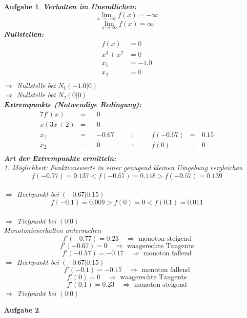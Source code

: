 \documentclass[12pt]{article}
\theoremstyle{note}
\newtheorem{aufgabe}{Aufgabe}
\begin{document}
\begin{flushleft}
\begin{aufgabe}
{\bf Verhalten im Unendlichen:} 
\[ \lim_{x\rightarrow -\infty} f(x) =-\infty\]\[ \lim_{x\rightarrow\infty} f(x) =\infty\]{\bf Nullstellen:} 
\begin{align*} 
f(x)&=0 \\ 
x^{3} + x^{2}&=0 \\ 
x_1&=-1.0\\ 
x_2&=0\\ 
\end{align*} 
$\Rightarrow$ Nullstelle bei $N_1(-1.0|0)$ \\ 
$\Rightarrow$ Nullstelle bei $N_2(0|0)$ \\ 
{\bf Extrempunkte (Notwendige Bedingung):} 
\begin{alignat*}{7} 
f'(x)&=& &0& \\ 
x \left(3 x + 2\right)&=& &0& \\ 
x_1&=& &-0.67& \quad &:& \quad &f(-0.67)&=& \,0.15\\ 
x_2&=& &0& \quad &:& \quad &f(0)&=& \,0\\ 
\end{alignat*} 
{\bf Art der Extrempunkte ermitteln:} \\[1em] 
{\em 1. M\"oglichkeit:} Funktionswerte in einer gen\"ugend kleinen Umgebung vergleichen \\ 
$$f(-0.77)=0.137  <  f(-0.67)=0.148  >  f(-0.57)=0.139$$\\ 
$\Rightarrow$ Hochpunkt bei $(-0.67|0.15)$ \\ 
\vspace{1em}$$f(-0.1)=0.009  >  f(0)=0  <   f(0.1)=0.011$$\\ 
$\Rightarrow$ Tiefpunkt bei $(0|0)$ \\ 
\vspace{1em}{\em 2. M\"oglichkeit:} Monotonieverhalten untersuchen \\ 
$$f'(-0.77)=0.23\quad \Rightarrow \text{ monoton steigend} $$$$f'(-0.67)=0 \quad \Rightarrow \text{ waagerechte Tangente} $$$$f'(-0.57)=-0.17\quad \Rightarrow \text{ monoton fallend} $$$\Rightarrow$ Hochpunkt bei $(-0.67|0.15)$ \\ 
\vspace{1em}$$f'(-0.1)=-0.17\quad \Rightarrow \text{ monoton fallend} $$$$f'(0)=0 \quad \Rightarrow \text{ waagerechte Tangente} $$$$f'(0.1)=0.23\quad \Rightarrow \text{ monoton steigend} $$$\Rightarrow$ Tiefpunkt bei $(0|0)$ \\ 
\vspace{1em}
\end{aufgabe}\clearpage\begin{aufgabe} ~  

\end{aufgabe}
\end{flushleft}
\end{document}
